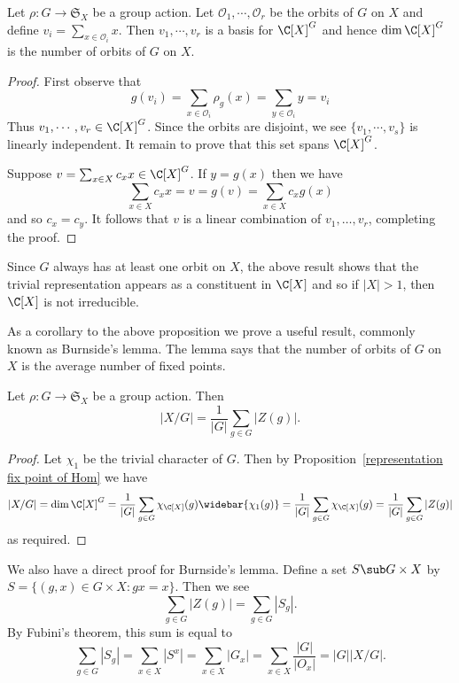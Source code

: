 \begin{proposition}\label{permutation representation invariant subspace basis}
Let $\rho:G\to\mathfrak{S}_X$ be a group action. Let $\mathcal{O}_1,\cdots,\mathcal{O}_r$ be the orbits of $G$ on $X$ and define $v_i=\sum_{x\in\mathcal{O}_i}x$. Then $v_1,\cdots,v_r$ is a basis for $\C[X]^G$ and hence $\dim\C[X]^G$ is the number of orbits of $G$ on $X$.
\end{proposition}
\begin{proof}
First observe that
\[g(v_i)=\sum_{x\in\mathcal{O}_i}\rho_g(x)=\sum_{y\in\mathcal{O}_i}y=v_i\]
Thus $v_1,\cdots,v_r\in\C[X]^G$. Since the orbits are disjoint, we see $\{v_1,\cdots,v_s\}$ is linearly independent. It remain to prove that this set spans $\C[X]^G$.\par
Suppose $v=\sum_{x\in X}c_xx\in \C[X]^G$. If $y=g(x)$ then we have
\[\sum_{x\in X}c_xx=v=g(v)=\sum_{x\in X}c_xg(x)\]
and so $c_x=c_y$. It follows that $v$ is a linear combination of $v_1,\dots,v_r$, completing the proof.
\end{proof}
Since $G$ always has at least one orbit on $X$, the above result shows that the trivial representation appears as a constituent in $\C[X]$ and so if $|X|>1$, then $\C[X]$ is not irreducible.\par 
As a corollary to the above proposition we prove a useful result,
commonly known as Burnside's lemma. The lemma says that the number of orbits of $G$ on $X$ is the average number of fixed points.
\begin{proposition}
Let $\rho:G\to\mathfrak{S}_X$ be a group action. Then
\[|X/G|=\frac{1}{|G|}\sum_{g\in G}|Z(g)|.\]
\end{proposition}
\begin{proof}
Let $\chi_1$ be the trivial character of $G$. Then by Proposition~\ref{representation fix point of Hom} we have
\[|X/G|=\dim\C[X]^G=\frac{1}{|G|}\sum_{g\in G}\chi_{\C[X]}(g)\widebar{\chi_1(g)}=\frac{1}{|G|}\sum_{g\in G}\chi_{\C[X]}(g)=\frac{1}{|G|}\sum_{g\in G}|Z(g)|\]
as required.
\end{proof}
\begin{remark}
We also have a direct proof for Burnside's lemma. Define a set $S\sub G\times X$ by $S=\{(g,x)\in G\times X:gx=x\}$. Then we see
\[\sum_{g\in G}|Z(g)|=\sum_{g\in G}|S_g|.\]
By Fubini's theorem, this sum is equal to
\[\sum_{g\in G}|S_g|=\sum_{x\in X}|S^x|=\sum_{x\in X}|G_x|=\sum_{x\in X}\frac{|G|}{|O_x|}=|G||X/G|.\]
\end{remark}
